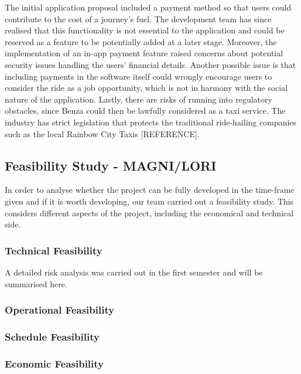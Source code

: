 \documentclass{article}
\begin{document}
    The initial application proposal included a payment method so that users could contribute to the cost of a journey's fuel. The development team has since realised that this functionality is not essential to the application and could be reserved as a feature to be potentially added at a later stage. Moreover, the implementation of an in-app payment feature raised concerns about potential security issues handling the users' financial details. Another possible issue is that including payments in the software itself could wrongly encourage users to consider the ride as a job opportunity, which is not in harmony with the social nature of the application. Lastly, there are risks of running into regulatory obstacles, since Benza could then be lawfully considered as a taxi service. The industry has strict legislation that protects the traditional ride-hailing companies such as the local Rainbow City Taxis [REFERENCE].\par
    
    \subsection{Feasibility Study - MAGNI/LORI}
    \label{subsec:feasibilitystudy}
    In order to analyse whether the project can be fully developed in the time-frame given and if it is worth developing, our team carried out a feasibility study. This considers different aspects of the project, including the economical and technical side. 
        \subsubsection{Technical Feasibility}
        A detailed risk analysis was carried out in the first semester and will be summarised here. 
        \subsubsection{Operational Feasibility}
        \subsubsection{Schedule Feasibility}
        \subsubsection{Economic Feasibility}
    

\newpage
\end{document}
